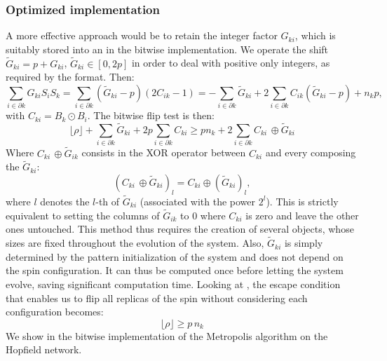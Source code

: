 \subsubsection{Optimized implementation}
A more effective approach would be to retain the integer factor $G_{ki}$, which is suitably stored into an \UnsignedInt in the bitwise implementation. We operate the shift $\tilde{G}_{ki} = p + G_{ki}$, $\tilde{G}_{ki} \in [0, 2p]$ in order to deal with positive only integers, as required by the \UnsignedInt format. Then:
\begin{equation*}
    \sum_{i \in \partial k} G_{ki} S_i S_k = \sum_{i \in \partial k}(\tilde{G}_{ki}-p)(2C_{ik}-1)
    = -\sum_{i \in \partial k} \tilde{G}_{ki} + 2\sum_{i \in \partial k}
     C_{ik}(\tilde{G}_{ki}-p) + n_k p,
\end{equation*}
with $C_{ki}= B_k \odot B_i$.
The bitwise flip test is then:
\begin{equation}
    \lfloor \rho \rfloor + \sum_{i \in \partial k} \tilde{G}_{ki} + 2p\sum_{i \in \partial k} C_{ki} \geq  pn_k+
    2\sum_{i \in \partial k} C_{ki}\, \oplus \tilde{G}_{ki}
\end{equation}
Where $C_{ki}\, \oplus \tilde{G}_{ik}$ consists in the XOR operator between $C_{ki}$ and every \Bits composing the \UnsignedInt $\tilde{G}_{ki}$:
\begin{equation*}
  \left(C_{ki}\, \oplus \tilde{G}_{ki}\right)_l = C_{ki} \oplus \left(\tilde{G}_{ki}\right)_l,
\end{equation*}
where $l$ denotes the $l$-th \Bits of $\tilde{G}_{ki}$ (associated with the power $2^l$).
This is strictly equivalent to setting the columns of $\tilde{G}_{ik}$ to 0 where $C_{ki}$ is zero and leave the other ones untouched. This method thus requires the creation of several \UnsignedInt objects, whose sizes are fixed throughout the evolution of the system. Also, $\tilde{G}_{ki}$ is simply determined by the pattern initialization of the system and does not depend on the spin configuration. It can thus be computed once before letting the system evolve, saving significant computation time. Looking at , the escape condition that enables us to flip all replicas of the spin without considering each configuration becomes:
\begin{equation}
    \lfloor \rho \rfloor \geq p\,n_k
    \label{eq:escape_condition_hopfield_bitwise}
\end{equation}
We show in  the bitwise implementation of the Metropolis algorithm on the Hopfield network.

